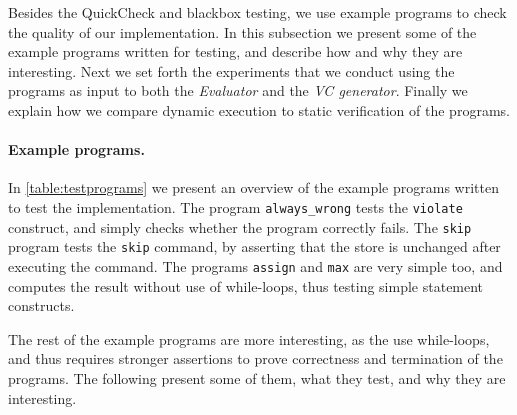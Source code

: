 Besides the QuickCheck and blackbox testing, we use example programs to check the quality of our implementation.
In this subsection we present some of the example programs written for testing, and describe how and why they are interesting.
Next we set forth the experiments that we conduct using the programs as input to both the \textit{Evaluator} and the \textit{VC generator}.
Finally we explain how we compare dynamic execution to static verification of the programs.

\paragraph{Example programs.}
In \autoref{table:testprograms} we present an overview of the example programs written to test the implementation.
The program \texttt{always\_wrong} tests the \texttt{violate} construct, and simply checks whether the program correctly fails.
The \texttt{skip} program tests the \texttt{skip} command, by asserting that the store is unchanged after executing the command.
The programs \texttt{assign} and \texttt{max} are very simple too, and computes the result without use of while-loops, thus testing simple statement constructs.

The rest of the example programs are more interesting, as the use while-loops, and thus requires stronger assertions to prove correctness and termination of the programs.
The following present some of them, what they test, and why they are interesting.

